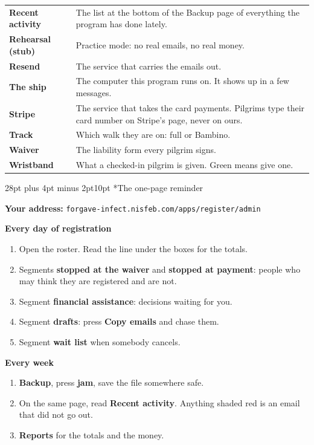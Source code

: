 \documentclass[12pt]{article}
\makeatletter
\renewcommand\section{\@startsection{section}{1}{0pt}%
  {28pt plus 4pt minus 2pt}{10pt}%
  {\normalfont\Large\bfseries\color{accent}}}
\newcommand{\btn}[1]{\textbf{#1}}
\makeatother
\begin{document}
\begin{tabularx}{\linewidth}{@{}L{1.5in}Y@{}}
\textbf{Recent activity} & The list at the bottom of the Backup page of
everything the program has done lately. \\
\textbf{Rehearsal (stub)} & Practice mode: no real emails, no real
money. \\
\textbf{Resend} & The service that carries the emails out. \\
\textbf{The ship} & The computer this program runs on. It shows up in a
few messages. \\
\textbf{Stripe} & The service that takes the card payments. Pilgrims
type their card number on Stripe's page, never on ours. \\
\textbf{Track} & Which walk they are on: full or Bambino. \\
\textbf{Waiver} & The liability form every pilgrim signs. \\
\textbf{Wristband} & What a checked-in pilgrim is given. Green means
give one. \\
\bottomrule
\end{tabularx}

\newpage
\section*{The one-page reminder}

\textbf{Your address:} \texttt{forgave-infect.nisfeb.com/apps/register/admin}

\textbf{Every day of registration}

\begin{enumerate}[leftmargin=*,itemsep=4pt]
\item Open the roster. Read the line under the boxes for the totals.
\item Segments \btn{stopped at the waiver} and \btn{stopped at
  payment}: people who may think they are registered and are not.
\item Segment \btn{financial assistance}: decisions waiting for you.
\item Segment \btn{drafts}: press \btn{Copy emails} and chase them.
\item Segment \btn{wait list} when somebody cancels.
\end{enumerate}

\textbf{Every week}

\begin{enumerate}[leftmargin=*,itemsep=4pt]
\item \btn{Backup}, press \btn{jam}, save the file somewhere safe.
\item On the same page, read \btn{Recent activity}. Anything shaded red
  is an email that did not go out.
\item \btn{Reports} for the totals and the money.
\end{enumerate}
\end{document}

